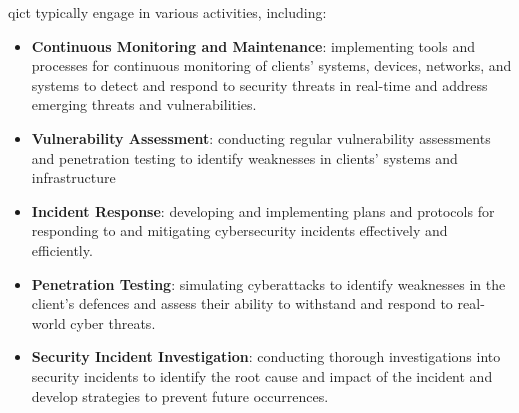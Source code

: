 % 
% 

\acrshort{qict} typically engage in various activities, including:
\begin{itemize}
      \item \textbf{Continuous Monitoring and Maintenance}: implementing tools and processes for continuous
            monitoring of clients' systems, devices, networks, and systems to detect and respond to security
            threats in real-time and address emerging threats and vulnerabilities.
      \item \textbf{Vulnerability Assessment}: conducting regular vulnerability assessments and penetration
            testing to identify weaknesses in clients' systems and infrastructure
      \item \textbf{Incident Response}: developing and implementing plans and protocols for responding to
            and mitigating cybersecurity incidents effectively and efficiently.
      \item \textbf{Penetration Testing}: simulating cyberattacks to identify weaknesses in the client's
            defences and assess their ability to withstand and respond to real-world cyber threats.
      \item \textbf{Security Incident Investigation}: conducting thorough investigations into security
            incidents to identify the root cause and impact of the incident and develop strategies to prevent
            future occurrences.
\end{itemize}
